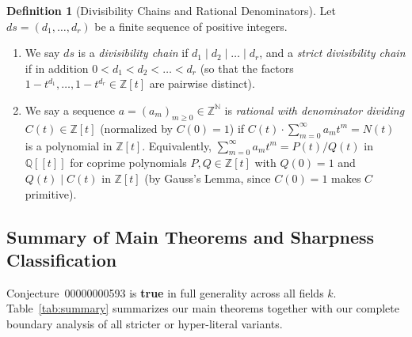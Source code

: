 \documentclass[11pt]{article}
\theoremstyle{definition}
\newtheorem{definition}[theorem]{Definition}
\theoremstyle{remark}
\begin{document}
\begin{definition}[Divisibility Chains and Rational Denominators]
\label{def:chain}
Let $ds = (d_1,\dots,d_r)$ be a finite sequence of positive integers.
\begin{enumerate}
\item[(a)] We say $ds$ is a \emph{divisibility chain} if $d_1 \mid d_2 \mid \dots \mid d_r$, and a \emph{strict divisibility chain} if in addition $0 < d_1 < d_2 < \dots < d_r$ (so that the factors $1 - t^{d_1}, \dots, 1 - t^{d_r} \in \mathbb{Z}[t]$ are pairwise distinct).
\item[(b)] We say a sequence $a = (a_m)_{m \ge 0} \in \mathbb{Z}^{\mathbb{N}}$ is \emph{rational with denominator dividing} $C(t) \in \mathbb{Z}[t]$ (normalized by $C(0) = 1$) if $C(t) \cdot \sum_{m=0}^{\infty} a_m t^m = N(t)$ is a polynomial in $\mathbb{Z}[t]$. Equivalently, $\sum_{m=0}^{\infty} a_m t^m = P(t)/Q(t)$ in $\mathbb{Q}[[t]]$ for coprime polynomials $P, Q \in \mathbb{Z}[t]$ with $Q(0) = 1$ and $Q(t) \mid C(t)$ in $\mathbb{Z}[t]$ (by Gauss's Lemma, since $C(0) = 1$ makes $C$ primitive).
\end{enumerate}
\end{definition}

\subsection{Summary of Main Theorems and Sharpness Classification}

Conjecture~00000000593 is \textbf{true} in full generality across all fields $k$. Table~\ref{tab:summary} summarizes our main theorems together with our complete boundary analysis of all stricter or hyper-literal variants.
\end{document}
